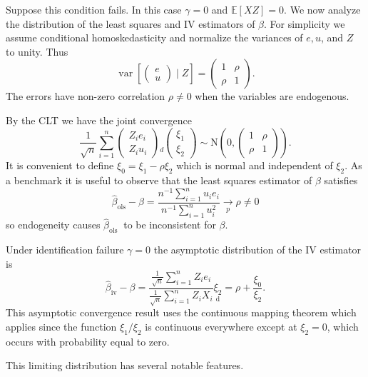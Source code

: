 \documentclass[10pt]{article}
\begin{document}
Suppose this condition fails. In this case $\gamma=0$ and $\mathbb{E}[X Z]=0$. We now analyze the distribution of the least squares and IV estimators of $\beta$. For simplicity we assume conditional homoskedasticity and normalize the variances of $e, u$, and $Z$ to unity. Thus
$$
\operatorname{var}\left[\left(\begin{array}{c}
e \\
u
\end{array}\right) \mid Z\right]=\left(\begin{array}{ll}
1 & \rho \\
\rho & 1
\end{array}\right) .
$$
The errors have non-zero correlation $\rho \neq 0$ when the variables are endogenous.

By the CLT we have the joint convergence
$$
\frac{1}{\sqrt{n}} \sum_{i=1}^{n}\left(\begin{array}{c}
Z_{i} e_{i} \\
Z_{i} u_{i}
\end{array}\right) \underset{d}{ }\left(\begin{array}{l}
\xi_{1} \\
\xi_{2}
\end{array}\right) \sim \mathrm{N}\left(0,\left(\begin{array}{cc}
1 & \rho \\
\rho & 1
\end{array}\right)\right) .
$$
It is convenient to define $\xi_{0}=\xi_{1}-\rho \xi_{2}$ which is normal and independent of $\xi_{2}$. As a benchmark it is useful to observe that the least squares estimator of $\beta$ satisfies
$$
\widehat{\beta}_{\mathrm{ols}}-\beta=\frac{n^{-1} \sum_{i=1}^{n} u_{i} e_{i}}{n^{-1} \sum_{i=1}^{n} u_{i}^{2}} \underset{p}{\longrightarrow} \rho \neq 0
$$
so endogeneity causes $\widehat{\beta}_{\text {ols }}$ to be inconsistent for $\beta$.

Under identification failure $\gamma=0$ the asymptotic distribution of the IV estimator is
$$
\widehat{\beta}_{\mathrm{iv}}-\beta=\frac{\frac{1}{\sqrt{n}} \sum_{i=1}^{n} Z_{i} e_{i}}{\frac{1}{\sqrt{n}} \sum_{i=1}^{n} Z_{i} X_{i}} \underset{\mathrm{d}}{\xi_{2}}=\rho+\frac{\xi_{0}}{\xi_{2}} .
$$
This asymptotic convergence result uses the continuous mapping theorem which applies since the function $\xi_{1} / \xi_{2}$ is continuous everywhere except at $\xi_{2}=0$, which occurs with probability equal to zero.

This limiting distribution has several notable features.
\end{document}
